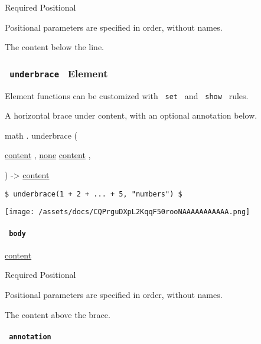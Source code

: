 {Required} {{ Positional }}

\label{functions-overline-body-positional-tooltip}
Positional parameters are specified in order, without names.

The content below the line.

\subsubsection{\texorpdfstring{\texttt{\ underbrace\ } {{ Element
}}}{ underbrace   Element }}\label{functions-underbrace}

\label{functions-underbrace-element-tooltip}
Element functions can be customized with \texttt{\ set\ } and
\texttt{\ show\ } rules.

A horizontal brace under content, with an optional annotation below.

math { . } { underbrace } (

{ \href{/docs/reference/foundations/content/}{content} , } {
\hyperref[functions-underbrace-parameters-annotation]{}
\href{/docs/reference/foundations/none/}{none}
\href{/docs/reference/foundations/content/}{content} , }

) -\textgreater{} \href{/docs/reference/foundations/content/}{content}

\begin{verbatim}
$ underbrace(1 + 2 + ... + 5, "numbers") $
\end{verbatim}

\texttt{[image: /assets/docs/CQPrguDXpL2KqqF50rooNAAAAAAAAAAA.png]}

\paragraph{\texorpdfstring{\texttt{\ body\ }}{ body }}\label{functions-underbrace-body}

\href{/docs/reference/foundations/content/}{content}

{Required} {{ Positional }}

\label{functions-underbrace-body-positional-tooltip}
Positional parameters are specified in order, without names.

The content above the brace.

\paragraph{\texorpdfstring{\texttt{\ annotation\ }}{ annotation }}\label{functions-underbrace-annotation}

